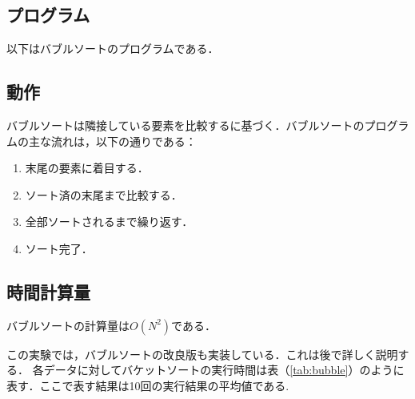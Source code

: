 \documentclass[a4j, titlepage]{jarticle}
\begin{document}
        \subsection{プログラム}
            以下はバブルソートのプログラムである．
            

        \subsection{動作}
            バブルソートは隣接している要素を比較するに基づく．バブルソートのプログラムの主な流れは，以下の通りである：
            \begin{screen}
                    \begin{enumerate}
                        \item 末尾の要素に着目する．
                        \item ソート済の末尾まで比較する．
                        \item 全部ソートされるまで繰り返す．
                        \item ソート完了．
                    \end{enumerate}    
            \end{screen}

        \subsection{時間計算量}
            バブルソートの計算量は$ O(N^2) $である．

            この実験では，バブルソートの改良版も実装している．これは後で詳しく説明する．
            各データに対してバケットソートの実行時間は表（\ref{tab:bubble}）のように表す．ここで表す結果は10回の実行結果の平均値である.
\end{document}
